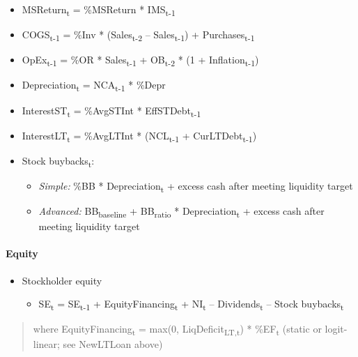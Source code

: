 \documentclass[12pt,a4paper]{article}
\begin{document}
\begin{itemize}
\item
  MSReturn\textsubscript{t} = \%MSReturn * IMS\textsubscript{t-1}
\item
  COGS\textsubscript{t-1} = \%Inv * (Sales\textsubscript{t-2} --
  Sales\textsubscript{t-1}) + Purchases\textsubscript{t-1}
\item
  OpEx\textsubscript{t-1} = \%OR * Sales\textsubscript{t-1} +
  OB\textsubscript{t-2} * (1 + Inflation\textsubscript{t-1})
\item
  Depreciation\textsubscript{t} = NCA\textsubscript{t-1} * \%Depr
\item
  InterestST\textsubscript{t} = \%AvgSTInt *
  EffSTDebt\textsubscript{t-1}
\item
  InterestLT\textsubscript{t} = \%AvgLTInt * (NCL\textsubscript{t-1} +
  CurLTDebt\textsubscript{t-1})
\item
  Stock buybacks\textsubscript{t}:

  \begin{itemize}
  \item
    \textit{Simple:}\;
    \%BB * Depreciation\textsubscript{t} + excess cash after meeting
    liquidity target
  \item
    \textit{Advanced:}\;
    BB\textsubscript{baseline} + BB\textsubscript{ratio} *
    Depreciation\textsubscript{t} + excess cash after meeting liquidity
    target
  \end{itemize}
\end{itemize}

\paragraph{Equity}

\begin{itemize}
\item
  Stockholder equity

  \begin{itemize}
  \item
    SE\textsubscript{t} = SE\textsubscript{t-1} +
    EquityFinancing\textsubscript{t} + NI\textsubscript{t} --
    Dividends\textsubscript{t} -- Stock buybacks\textsubscript{t}
  \end{itemize}
\end{itemize}

\begin{quote}
where EquityFinancing\textsubscript{t} = max(0,
LiqDeficit\textsubscript{LT,t}) * \%EF\textsubscript{t}
(static or logit-linear; see NewLTLoan above)
\end{quote}
\end{document}

